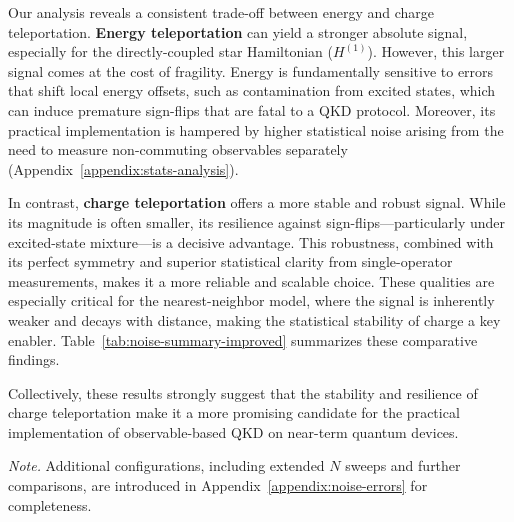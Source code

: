 Our analysis reveals a consistent trade-off between energy and charge teleportation. \textbf{Energy teleportation} can yield a stronger absolute signal, especially for the directly-coupled star Hamiltonian ($H^{(1)}$). However, this larger signal comes at the cost of fragility. Energy is fundamentally sensitive to errors that shift local energy offsets, such as contamination from excited states, which can induce premature sign-flips that are fatal to a QKD protocol. Moreover, its practical implementation is hampered by higher statistical noise arising from the need to measure non-commuting observables separately (Appendix~\ref{appendix:stats-analysis}).

In contrast, \textbf{charge teleportation} offers a more stable and robust signal. While its magnitude is often smaller, its resilience against sign-flips—particularly under excited-state mixture—is a decisive advantage. This robustness, combined with its perfect symmetry and superior statistical clarity from single-operator measurements, makes it a more reliable and scalable choice. These qualities are especially critical for the nearest-neighbor model, where the signal is inherently weaker and decays with distance, making the statistical stability of charge a key enabler. Table~\ref{tab:noise-summary-improved} summarizes these comparative findings.

Collectively, these results strongly suggest that the stability and resilience of charge teleportation make it a more promising candidate for the practical implementation of observable-based QKD on near-term quantum devices.

\medskip
\noindent\emph{Note.} Additional configurations, including extended \(N\) sweeps and further comparisons, are introduced in Appendix~\ref{appendix:noise-errors} for completeness.
